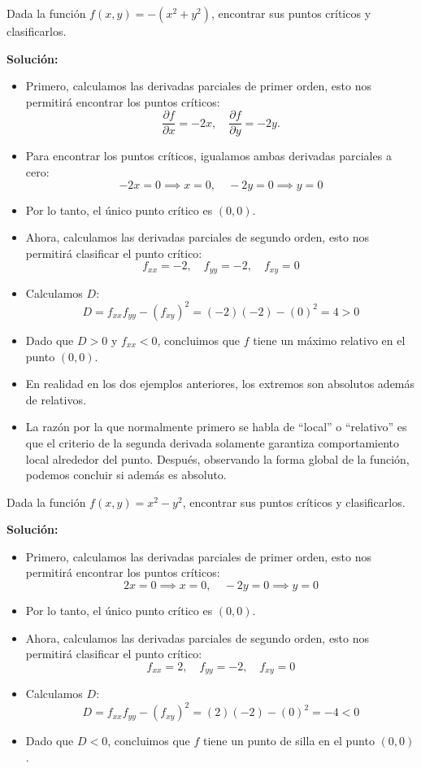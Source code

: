 \begin{ejemplo}
    Dada la función $f(x,y)=-(x^2+y^2)$, encontrar sus puntos críticos y clasificarlos.
\end{ejemplo}

\textbf{Solución:}
\begin{itemize}
    \item Primero, calculamos las derivadas parciales de primer orden, esto nos permitirá encontrar los puntos críticos:
    \[
\frac{\partial f}{\partial x} = -2x, \quad \frac{\partial f}{\partial y} = -2y.
    \]
    \item Para encontrar los puntos críticos, igualamos ambas derivadas parciales a cero:
    \[
    -2x = 0 \implies x = 0, \quad -2y = 0 \implies y = 0
    \]
    \item Por lo tanto, el único punto crítico es $(0,0)$.
    \item Ahora, calculamos las derivadas parciales de segundo orden, esto nos permitirá clasificar el punto crítico:
    \[
    f_{xx} = -2, \quad f_{yy} = -2, \quad f_{xy} = 0
    \]
    \item Calculamos $D$:
    \[
    D = f_{xx}f_{yy} - (f_{xy})^2 = (-2)(-2) - (0)^2 = 4 > 0
    \]
    \item Dado que $D > 0$ y $f_{xx} < 0$, concluimos que $f$ tiene un máximo relativo en el punto $(0,0)$.
\end{itemize}

\begin{nota}
\begin{itemize}
    \item En realidad en los dos ejemplos anteriores, los extremos son absolutos además de relativos.
    \item La razón por la que normalmente primero se habla de “local” o “relativo” es que el criterio de la segunda derivada solamente garantiza comportamiento local alrededor del punto. Después, observando la forma global de la función, podemos concluir si además es absoluto.
\end{itemize}
\end{nota}

\begin{ejemplo}
    Dada la función $f(x,y)=x^2-y^2$, encontrar sus puntos críticos y clasificarlos.
\end{ejemplo}
\textbf{Solución:}
\begin{itemize}
    \item Primero, calculamos las derivadas parciales de primer orden, esto nos permitirá encontrar los puntos críticos:
    \[
    2x = 0 \implies x = 0, \quad -2y = 0 \implies y = 0
    \]
    \item Por lo tanto, el único punto crítico es $(0,0)$.
    \item Ahora, calculamos las derivadas parciales de segundo orden, esto nos permitirá clasificar el punto crítico:
    \[
    f_{xx} = 2, \quad f_{yy} = -2, \quad f_{xy} = 0
    \]
    \item Calculamos $D$:
    \[
    D = f_{xx}f_{yy} - (f_{xy})^2 = (2)(-2) - (0)^2 = -4 < 0
    \]
    \item Dado que $D < 0$, concluimos que $f$ tiene un punto de silla en el punto $(0,0)$.
\end{itemize}

